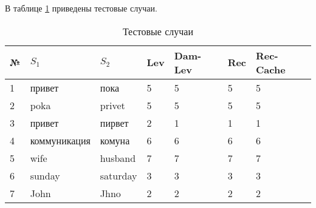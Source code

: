В таблице \ref{table:tests} приведены тестовые случаи.

\begin{table}[H]
	\centering
	\caption{\label{table:tests} Тестовые случаи}
	\begin{center}
		\begin{tabular}{|l|l|l|l|l|l|l|}
			\hline № & $S_1$ & $S_2$ & Lev & Dam-Lev & Rec & Rec-Cache \\ \hline
			1 & привет & пока & 5 & 5 & 5 & 5 \\ \hline
			2 & poka & privet & 5 & 5 & 5 & 5 \\ \hline
			3 & привет & пирвет & 2 & 1 & 1 & 1 \\ \hline
			4 & коммуникация & комуна & 6 & 6 & 6 & 6 \\ \hline
			5 & wife & husband & 7 & 7 & 7 & 7 \\ \hline
			6 & sunday & saturday & 3 & 3 & 3 & 3 \\ \hline
			7 & John & Jhno & 2 & 2 & 2 & 2 \\ \hline
		\end{tabular}
	\end{center}
\end{table}